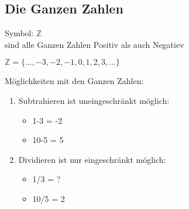 \subsection{Die Ganzen Zahlen}
Symbol: $\mathbb{Z}$\\
sind alle Ganzen Zahlen Positiv als auch Negatiev

\hfill \break
\hfill \break
$ \mathbb{Z}=\{\ldots,-3,-2,-1,0,1,2,3,\ldots\} $

\hfill \break
{}

\hfill \break
Möglichkeiten mit den Ganzen Zahlen:
\begin{enumerate}
    \item Subtrahieren ist uneingeschränkt möglich:
          \begin{itemize}
              \item 1-3 = -2
              \item 10-5 = 5
          \end{itemize}
    \item Dividieren ist nur eingeschränkt möglich:
          \begin{itemize}
              \item 1/3 = ?
              \item 10/5 = 2
          \end{itemize}
\end{enumerate}